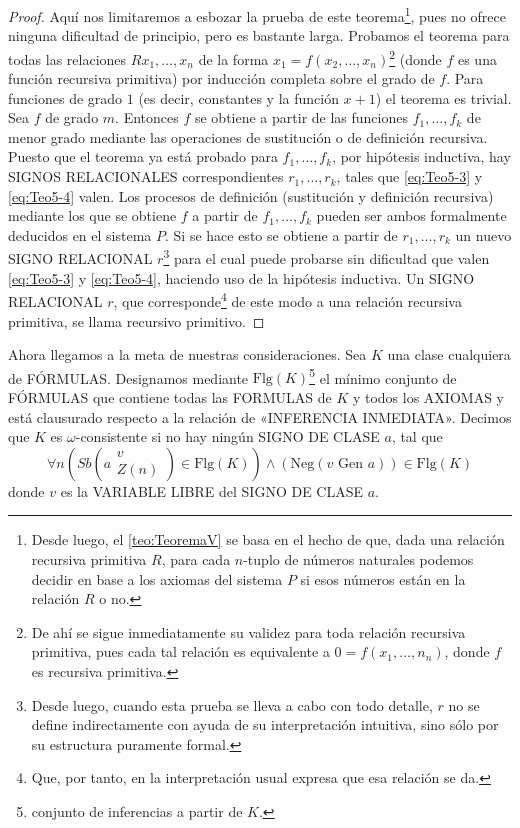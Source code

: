 \begin{proof}
    Aquí nos limitaremos a esbozar la prueba de este teorema\footnote{Desde luego, el \autoref{teo:TeoremaV} se basa en el hecho de que, dada una relación
    recursiva primitiva $R$, para cada $n$-tuplo de números naturales podemos decidir en base a los axiomas del sistema $P$ si esos números están en la 
    relación $R$ o no.}, pues no ofrece ninguna dificultad de principio, pero es bastante larga. Probamos el teorema para todas las relaciones
    $R x_1, \dots, x_n $ de la forma $x_1 = f(x_2, \dots, x_n)$\footnote{De ahí se sigue inmediatamente su validez para toda relación recursiva
    primitiva, pues cada tal relación es equivalente a $0 = f(x_1, \dots, n_n)$, donde $f$ es recursiva primitiva.} (donde $f$ es una función recursiva 
    primitiva) por inducción completa sobre el grado de $f$. Para funciones de grado $1$ (es decir, constantes y la función $x + 1$) el teorema es trivial. 
    Sea $f$ de grado $m$. Entonces $f$ se obtiene a partir de las funciones $f_1, \dots, f_k$ de menor grado mediante las operaciones de sustitución o de 
    definición recursiva. Puesto que el teorema ya está probado para $f_1, \dots, f_k$, por hipótesis inductiva, hay SIGNOS RELACIONALES correspondientes
    $r_1, \dots, r_k$, tales que \eqref{eq:Teo5-3} y \eqref{eq:Teo5-4} valen. Los procesos de definición (sustitución y definición recursiva) mediante los 
    que se obtiene $f$ a partir de $f_1, \dots, f_k$ pueden ser ambos formalmente deducidos en el sistema $P$. Si se hace esto se obtiene a partir de $r_1, \dots, r_k$
    un nuevo SIGNO RELACIONAL $r$\footnote{Desde luego, cuando esta prueba se lleva a cabo con todo detalle, $r$ no se define indirectamente con ayuda 
    de su interpretación intuitiva, sino sólo por su estructura puramente formal.} para el cual puede probarse sin dificultad que valen \eqref{eq:Teo5-3} 
    y \eqref{eq:Teo5-4}, haciendo uso de la hipótesis inductiva. Un SIGNO RELACIONAL $r$, que corresponde\footnote{Que, por tanto, en la interpretación 
    usual expresa que esa relación se da.} de este modo a una relación recursiva primitiva, se llama recursivo primitivo.
\end{proof}

Ahora llegamos a la meta de nuestras consideraciones. Sea $K$ una clase cualquiera de FÓRMULAS. Designamos mediante $\text{Flg}(K)$\footnote{conjunto de 
inferencias a partir de $K$.} el mínimo conjunto de FÓRMULAS que contiene todas las FORMULAS de $K$ y todos los AXIOMAS y está clausurado respecto a 
la relación de «INFERENCIA INMEDIATA». Decimos que $K$ es $\omega$-consistente si no hay ningún SIGNO DE CLASE $a$, tal que
\begin{equation}
    \forall n \left(
        Sb \left( a
            \begin{aligned}
                v \\
                Z(n)
            \end{aligned}
        \right)
        \in \text{Flg}(K)
    \right)
    \wedge (\text{Neg}(v \text{ Gen } a)) \in \text{Flg}(K)
\end{equation}
donde $v$ es la VARIABLE LIBRE del SIGNO DE CLASE $a$. 

